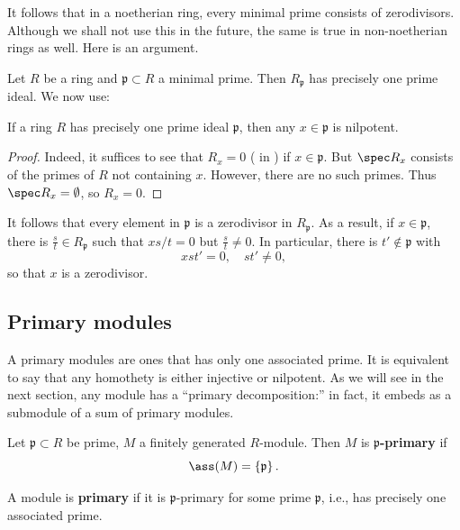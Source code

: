 \begin{remark} 
It follows that in a noetherian ring, every minimal prime consists of
zerodivisors. Although we shall not use this in the future, the same is true
in non-noetherian rings as well.  Here is an argument.

Let $R$ be a ring and $\mathfrak{p} \subset R$ a minimal prime. Then
$R_{\mathfrak{p}}$ has precisely one prime ideal.
We now use:

\begin{lemma} 
If a ring $R$ has precisely one prime ideal $\mathfrak{p}$, then any $x \in
\mathfrak{p}$ is nilpotent.
\end{lemma} 
\begin{proof} 
Indeed, it suffices to see that $R_x = 0$ ( in
) if $x \in
\mathfrak{p}$. But $\spec R_x$
consists of the primes of $R$ not containing $x$. However, there are no such
primes. Thus $\spec R_x = \emptyset$, so $R_x = 0$.
\end{proof} 

It follows that every element in $\mathfrak{p}$ is a zerodivisor in
$R_{\mathfrak{p}}$.
As a result, if $x \in \mathfrak{p}$, there is $\frac{s}{t} \in
R_{\mathfrak{p}}$ such that $xs/t = 0$ but $\frac{s}{t} \neq 0$.
In particular, there is $t' \notin \mathfrak{p}$ with 
\[ xst' = 0, \quad st' \neq 0,  \]
so that $x$ is a zerodivisor. 
\end{remark}



\subsection{Primary modules}

A primary modules are ones that has only one associated prime. It is equivalent
to say that any homothety is either injective or nilpotent. 
As we will see in the next section, any module has a ``primary
decomposition:'' in fact, it embeds as a submodule of a sum of primary
modules.

\begin{definition} 
Let $\mathfrak{p} \subset R$ be prime, $M$ a finitely generated  $R$-module. Then $M$ is
\textbf{$\mathfrak{p}$-primary} if 
\[ \ass(M) = \left\{\mathfrak{p}\right\}.  \]

A module is \textbf{primary} if it is $\mathfrak{p}$-primary for some
prime $\mathfrak{p}$, i.e., has precisely one associated prime. 
\end{definition} 

